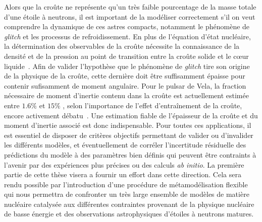 Alors que la croûte ne représente qu'un très faible pourcentage de la masse 
totale d'une étoile à neutrons, il est important de la modéliser correctement
s'il on veut comprendre la dynamique de ces astres compacts, notamment le
phénomène de \textit{glitch} et les processus de refroidissement. En plus de 
l'équation d'état nucléaire, la détermination des observables de la croûte 
nécessite la connaissance de la densité et de la pression au point de 
transition entre la croûte solide et le c\oe ur liquide~\cite{Piekarewicz2014}. 
Afin de valider l'hypothèse que le phénomène de \textit{glitch} tire son 
origine de la physique de la croûte, cette dernière doit être suffisamment 
épaisse pour contenir sufisamment de moment angulaire. Pour le pulsar de Vela, 
la fraction nécessaire de moment d'inertie contenu dans la croûte est 
actuellement estimée entre $1.6\%$ et 
$15\%$ \cite{Link1999,Andersson2012,Delsate2016}, selon 
l'importance de l'effet d'entraînement de la croûte, encore
activement débatu~\cite{Martin2016,Watanabe2017}. 
Une estimation fiable de l'épaisseur de la croûte et du moment d'inertie 
associé est donc indispensable. 
%
Pour toutes ces applications, il est essentiel de disposer de critères 
objectifs permettant de valider ou d'invalider les différents modèles, et 
éventuellement de corréler l'incertitude résiduelle des prédictions du modèle 
à des paramètres bien définis qui peuvent être contraints à l'avenir par des 
expériences plus précises ou des calculs \textit{ab initio}. 
La première partie de cette thèse visera a fournir un effort dans cette 
direction. Cela sera rendu possible par l'introduction d'une procédure de 
métamodélisation flexible qui nous permettra de confronter un très large 
ensemble de modèles de matière nucléaire catalysée aux différentes contraintes 
provenant de la physique nucléaire de basse énergie et des observations 
astrophysiques d'étoiles à neutrons matures. 

